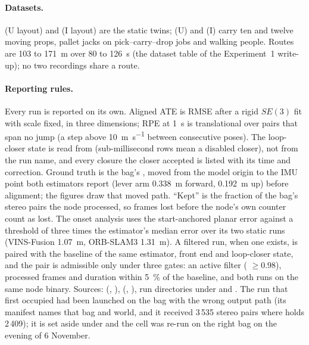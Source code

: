 \documentclass[11pt,a4paper,notitlepage]{report}
\begin{document}
\paragraph{Datasets.}  (U layout) and  (I
layout) are the static twins;  (U) and  (I) carry ten and
twelve moving props, pallet jacks on pick--carry--drop jobs and walking people.
Routes are 103 to \SI{171}{\metre} over 80 to \SI{126}{\second}
(the dataset table of the Experiment~1 write-up); no two recordings share a
route.

\paragraph{Reporting rules.}
\label{sec:vio-filter-method}
Every run is reported on its own. Aligned ATE is RMSE after a rigid $SE(3)$
fit with scale fixed, in three dimensions; RPE at \SI{1}{\second} is
translational over pairs that span no jump (a step above
\SI{10}{\metre\per\second} between consecutive poses). The loop-closer state
is read from  (sub-millisecond rows mean a disabled
closer), not from the run name, and every closure the closer accepted is
listed with its time and correction. Ground truth is the bag's
, moved from the model origin to the IMU point
both estimators report (lever arm \SI{0.338}{\metre} forward,
\SI{0.192}{\metre} up) before alignment; the figures draw that moved path.
``Kept'' is the fraction of the bag's stereo pairs the node processed, so
frames lost before the node's own counter count as lost. The onset analysis
uses the start-anchored planar error against a threshold of three times the
estimator's median error over its two static runs (VINS-Fusion
\SI{1.07}{\metre}, ORB-SLAM3 \SI{1.31}{\metre}). A filtered run, when one
exists, is paired with the baseline of the same estimator, front end and
loop-closer state, and the pair is admissible only under three gates: an
active filter ( $\ge 0.98$), processed frames and
duration within \SI{5}{\percent} of the baseline, and both runs on the same
node binary. Sources: 
(, ),
(, ), run directories under
 and .
The run that first occupied  had been
launched on the  bag with the wrong output path (its
manifest names that bag and world, and it received 3\,535 stereo pairs where
 holds 2\,409); it is set aside under
 and the cell was re-run on the right
bag on the evening of 6 November.
\end{document}
